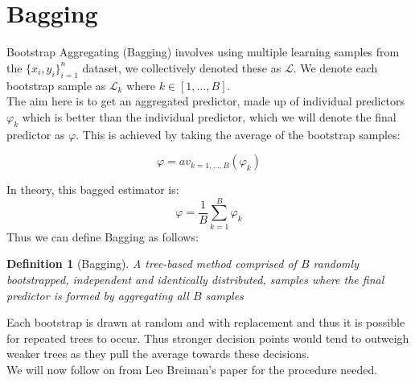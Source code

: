 \documentclass[11pt,a4paper]{report}
\newtheorem{definition}{Definition}
\begin{document}
\section{Bagging}
Bootstrap Aggregating (Bagging) involves using multiple learning samples from the $\{x_{i}, y_{i}\}_{i=1}^{n}$ dataset, we collectively denoted these as $\mathcal{L}$. 
We denote each bootstrap sample as $\mathcal{L}_k$ where $k \in [1, \dots, B]$.\\
The aim here is to get an aggregated predictor, made up of individual predictors $\varphi_k$ which is better than the individual predictor, which we will denote the final predictor as $\varphi$. 
This is achieved by taking the average of the bootstrap samples:

\[ \varphi = av_{k = 1,\dots,B} (\varphi_k) \]

In theory, this bagged estimator is:
\begin{equation}
    \varphi = \frac{1}{B} \sum_{k=1}^{B} \varphi_k
\end{equation}
Thus we can define Bagging as follows:
\begin{definition}[Bagging]
    A tree-based method comprised of $B$ \textit{randomly} bootstrapped, independent and identically distributed, samples where the final predictor is formed by aggregating all $B$ samples 
\end{definition}
Each bootstrap is drawn at random and with replacement and thus it is possible for repeated trees to occur. 
Thus stronger decision points would tend to outweigh weaker trees as they pull the average towards these decisions.
\medskip\\
We will now follow on from Leo Breiman's paper \cite{bagging} for the procedure needed.
\end{document}
